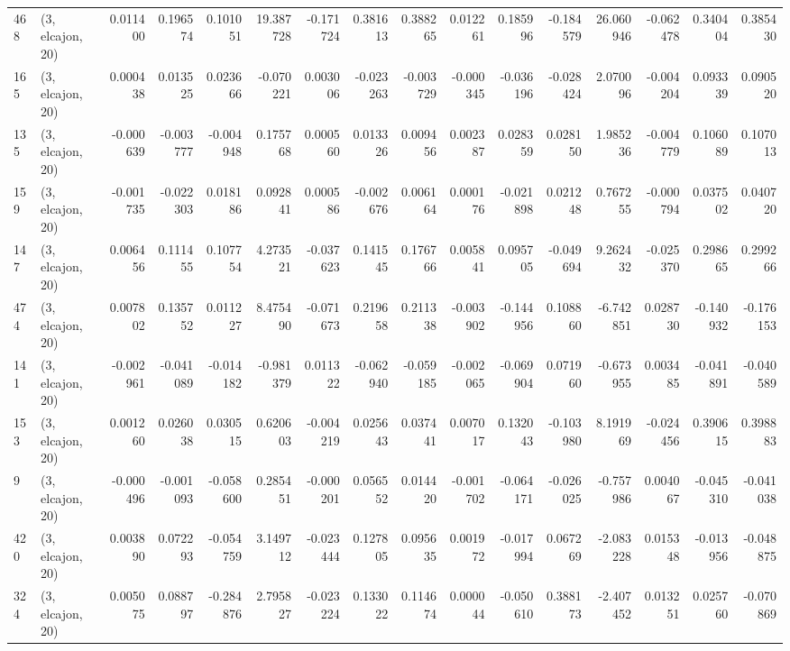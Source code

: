 \begin{tabular}{llrrrrrrrrrrrrrr}
468 &  (3, elcajon, 20) &   0.011400 &  0.196574 &  0.101051 &   19.387728 & -0.171724 &   0.381613 &  0.388265 &  0.012261 &  0.185996 & -0.184579 &    26.060946 & -0.062478 &  0.340404 &  0.385430 \\
165 &  (3, elcajon, 20) &   0.000438 &  0.013525 &  0.023666 &   -0.070221 &  0.003006 &  -0.023263 & -0.003729 & -0.000345 & -0.036196 & -0.028424 &     2.070096 & -0.004204 &  0.093339 &  0.090520 \\
135 &  (3, elcajon, 20) &  -0.000639 & -0.003777 & -0.004948 &    0.175768 &  0.000560 &   0.013326 &  0.009456 &  0.002387 &  0.028359 &  0.028150 &     1.985236 & -0.004779 &  0.106089 &  0.107013 \\
159 &  (3, elcajon, 20) &  -0.001735 & -0.022303 &  0.018186 &    0.092841 &  0.000586 &  -0.002676 &  0.006164 &  0.000176 & -0.021898 &  0.021248 &     0.767255 & -0.000794 &  0.037502 &  0.040720 \\
147 &  (3, elcajon, 20) &   0.006456 &  0.111455 &  0.107754 &    4.273521 & -0.037623 &   0.141545 &  0.176766 &  0.005841 &  0.095705 & -0.049694 &     9.262432 & -0.025370 &  0.298665 &  0.299266 \\
474 &  (3, elcajon, 20) &   0.007802 &  0.135752 &  0.011227 &    8.475490 & -0.071673 &   0.219658 &  0.211338 & -0.003902 & -0.144956 &  0.108860 &    -6.742851 &  0.028730 & -0.140932 & -0.176153 \\
141 &  (3, elcajon, 20) &  -0.002961 & -0.041089 & -0.014182 &   -0.981379 &  0.011322 &  -0.062940 & -0.059185 & -0.002065 & -0.069904 &  0.071960 &    -0.673955 &  0.003485 & -0.041891 & -0.040589 \\
153 &  (3, elcajon, 20) &   0.001260 &  0.026038 &  0.030515 &    0.620603 & -0.004219 &   0.025643 &  0.037441 &  0.007017 &  0.132043 & -0.103980 &     8.191969 & -0.024456 &  0.390615 &  0.398883 \\
9   &  (3, elcajon, 20) &  -0.000496 & -0.001093 & -0.058600 &    0.285451 & -0.000201 &   0.056552 &  0.014420 & -0.001702 & -0.064171 & -0.026025 &    -0.757986 &  0.004067 & -0.045310 & -0.041038 \\
420 &  (3, elcajon, 20) &   0.003890 &  0.072293 & -0.054759 &    3.149712 & -0.023444 &   0.127805 &  0.095635 &  0.001972 & -0.017994 &  0.067269 &    -2.083228 &  0.015348 & -0.013956 & -0.048875 \\
324 &  (3, elcajon, 20) &   0.005075 &  0.088797 & -0.284876 &    2.795827 & -0.023224 &   0.133022 &  0.114674 &  0.000044 & -0.050610 &  0.388173 &    -2.407452 &  0.013251 &  0.025760 & -0.070869 \\

\end{tabular}
